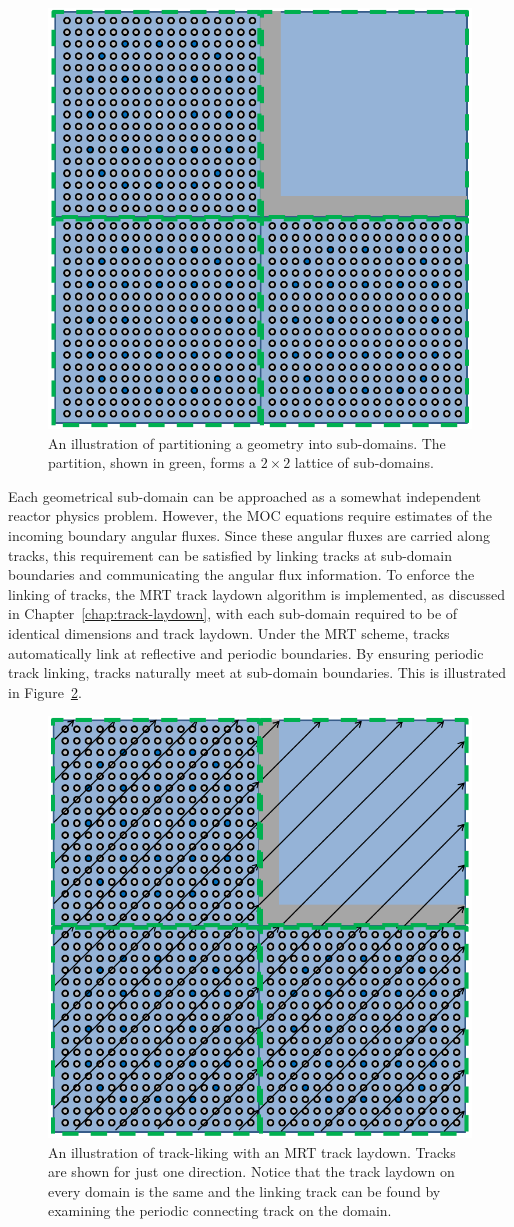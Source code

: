 \begin{figure}[h!]
	\centering
	\includegraphics[width=0.6\linewidth]{figures/DD/moc-dd-geometry.PNG}
	\caption[]{An illustration of partitioning a geometry into sub-domains. The partition, shown in green, forms a $2 \times 2$ lattice of sub-domains.}
	\label{fig:domain-partition}
\end{figure}

Each geometrical sub-domain can be approached as a somewhat independent reactor physics problem. However, the \ac{MOC} equations require estimates of the incoming boundary angular fluxes. Since these angular fluxes are carried along tracks, this requirement can be satisfied by linking tracks at sub-domain boundaries and communicating the angular flux information. To enforce the linking of tracks, the \ac{MRT} track laydown algorithm is implemented, as discussed in Chapter~\ref{chap:track-laydown}, with each sub-domain required to be of identical dimensions and track laydown. Under the \ac{MRT} scheme, tracks automatically link at reflective and periodic boundaries. By ensuring periodic track linking, tracks naturally meet at sub-domain boundaries. This is illustrated in Figure~\ref{fig:domain-track-linking}.

\begin{figure}[h!]
	\centering
	\includegraphics[width=0.6\linewidth]{figures/DD/moc-dd-rays.PNG}
	\caption[]{An illustration of track-liking with an \ac{MRT} track laydown. Tracks are shown for just one direction. Notice that the track laydown on every domain is the same and the linking track can be found by examining the periodic connecting track on the domain.}
	\label{fig:domain-track-linking}
\end{figure}

